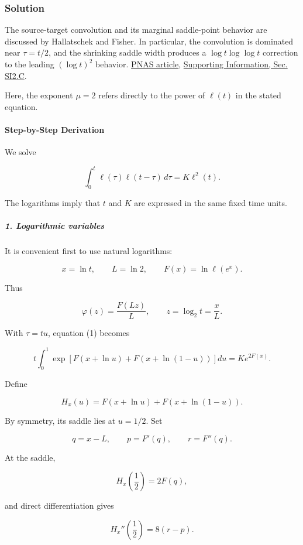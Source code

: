 \subsubsection*{Solution}
The source-target convolution and its marginal saddle-point behavior are discussed by Hallatschek and Fisher. In particular, the convolution is dominated near $\tau=t/2$, and the shrinking saddle width produces a $\log t\log\log t$ correction to the leading $(\log t)^2$ behavior. \href{\detokenize{https://doi.org/10.1073/pnas.1404663111}}{PNAS article}, \href{\detokenize{https://www.rpgroup.caltech.edu/virus_bootcamp/assets/pdfs/pnas-hall-dsf-full.pdf}}{Supporting Information, Sec. SI2.C}.

Here, the exponent $\mu=2$ refers directly to the power of $\ell(t)$ in the stated equation.

\paragraph*{Step-by-Step Derivation}

We solve

\[
\int_0^t\ell(\tau)\ell(t-\tau)\,d\tau =K\ell^2(t). \tag{1}
\]

The logarithms imply that $t$ and $K$ are expressed in the same fixed time units.

\subparagraph*{1. Logarithmic variables}

It is convenient first to use natural logarithms:

\[
x=\ln t,\qquad L=\ln 2,\qquad F(x)=\ln \ell(e^x).
\]

Thus

\[
\varphi(z)=\frac{F(Lz)}{L}, \qquad z=\log_2t=\frac{x}{L}. \tag{2}
\]

With $\tau=tu$, equation (1) becomes

\[
t\int_0^1 \exp\!\left[F(x+\ln u)+F(x+\ln(1-u))\right]du =K e^{2F(x)}. \tag{3}
\]

Define

\[
H_x(u)=F(x+\ln u)+F(x+\ln(1-u)).
\]

By symmetry, its saddle lies at $u=1/2$. Set

\[
q=x-L,\qquad p=F'(q),\qquad r=F''(q).
\]

At the saddle,

\[
H_x\!\left(\frac12\right)=2F(q),
\]

and direct differentiation gives

\[
H_x''\!\left(\frac12\right)=8(r-p).
\]

